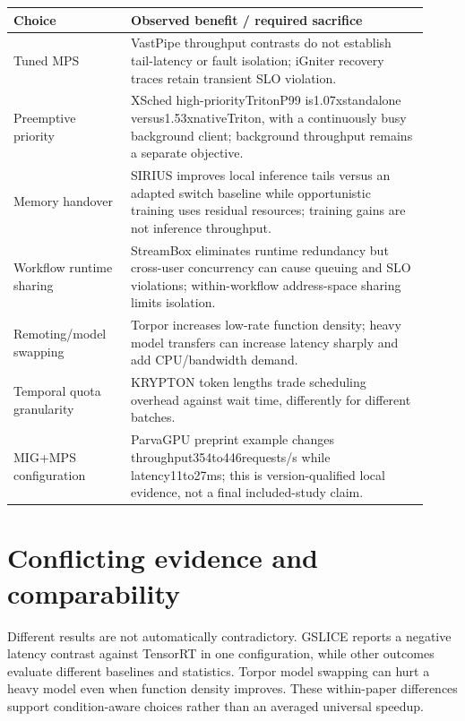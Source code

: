 \documentclass[12pt,a4paper]{article}
\begin{document}
{\small\begin{longtable}{>{\raggedright\arraybackslash}p{0.26\linewidth}>{\raggedright\arraybackslash}p{0.66\linewidth}}
\toprule
Choice & Observed benefit /\allowbreak{} required sacrifice\\\midrule
\endhead
Tuned MPS & VastPipe throughput contrasts do not establish tail-latency or fault isolation; iGniter recovery traces retain transient SLO violation.\\
Preemptive priority & XSched high-priorityTritonP99 is1.07xstandalone versus1.53xnativeTriton, with a continuously busy background client; background throughput remains a separate objective.\\
Memory handover & SIRIUS improves local inference tails versus an adapted switch baseline while opportunistic training uses residual resources; training gains are not inference throughput.\\
Workflow runtime sharing & StreamBox eliminates runtime redundancy but cross-user concurrency can cause queuing and SLO violations; within-workflow address-space sharing limits isolation.\\
Remoting/\allowbreak{}model swapping & Torpor increases low-rate function density; heavy model transfers can increase latency sharply and add CPU/\allowbreak{}bandwidth demand.\\
Temporal quota granularity & KRYPTON token lengths trade scheduling overhead against wait time, differently for different batches.\\
MIG+MPS configuration & ParvaGPU preprint example changes throughput354to446requests/\allowbreak{}s while latency11to27ms; this is version-qualified local evidence, not a final included-study claim.\\
\bottomrule
\end{longtable}}


\section{Conflicting evidence and comparability}

Different results are not automatically contradictory. GSLICE reports a negative latency contrast against TensorRT in one configuration, while other outcomes evaluate different baselines and statistics. Torpor model swapping can hurt a heavy model even when function density improves. These within-paper differences support condition-aware choices rather than an averaged universal speedup.
\end{document}
